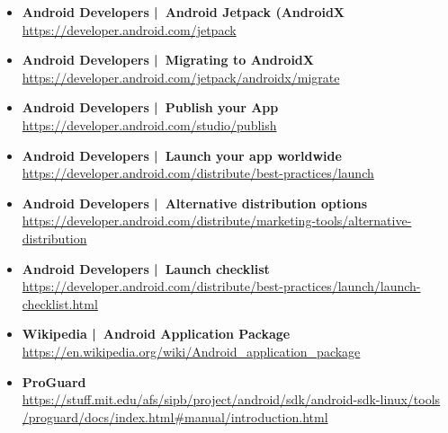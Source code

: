 \documentclass[a4paper]{article}
\begin{document}
{\begin{itemize}
		\item \textbf{Android Developers | Android Jetpack (AndroidX}\\
		\href{https://developer.android.com/jetpack}
		{https://developer.android.com/jetpack}
		
		\item \textbf{Android Developers | Migrating to AndroidX}\\
		\href{https://developer.android.com/jetpack/androidx/migrate}
		{https://developer.android.com/jetpack/androidx/migrate}
		
		\item \textbf{Android Developers | Publish your App}\\
		\href{https://developer.android.com/studio/publish}
		{https://developer.android.com/studio/publish}
		
		\item \textbf{Android Developers | Launch your app worldwide}\\
		\href{https://developer.android.com/distribute/best-practices/launch}
		{https://developer.android.com/distribute/best-practices/launch}
		
		\item \textbf{Android Developers | Alternative distribution options}\\
		\href{https://developer.android.com/distribute/marketing-tools/alternative-distribution}
		{https://developer.android.com/distribute/marketing-tools/alternative-distribution}
		
		\item \textbf{Android Developers | Launch checklist}\\
		\href{https://developer.android.com/distribute/best-practices/launch/launch-checklist.html}
		{https://developer.android.com/distribute/best-practices/launch/launch-checklist.html}
		
		\item \textbf{Wikipedia | Android Application Package}\\
		\href{https://en.wikipedia.org/wiki/Android_application_package}
		{https://en.wikipedia.org/wiki/Android\_application\_package}
		
		\item \textbf{ProGuard}\\
		\href{https://stuff.mit.edu/afs/sipb/project/android/sdk/android-sdk-linux/tools/proguard/docs/index.html#manual/introduction.html}
		{https://stuff.mit.edu/afs/sipb/project/android/sdk/android-sdk-linux/tools\\ \quad /proguard/docs/index.html\#manual/introduction.html}
		

\end{itemize}}
\end{document}
